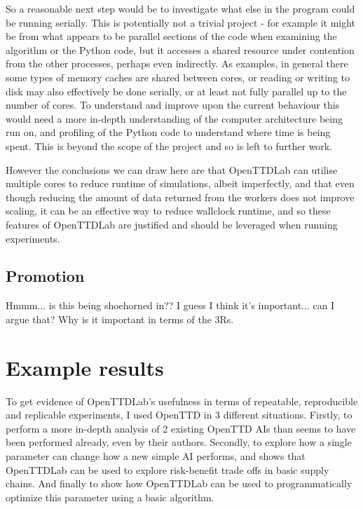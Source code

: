 \documentclass[logo,msc,dsti]{infthesis}    %
\begin{document}
So a reasonable next step would be to investigate what else in the program could be running serially. This is potentially not a trivial project - for example it might be from what appears to be parallel sections of the code when examining the algorithm or the Python code, but it accesses a shared resource under contention from the other processes, perhaps even indirectly. As examples, in general there some types of memory caches are shared between cores, or reading or writing to disk  may also effectively be done serially, or at least not fully parallel up to the number of cores. To understand and improve upon the current behaviour this would need a more in-depth understanding of the computer architecture being run on, and profiling of the Python code to understand where time is being spent. This is beyond the scope of the project and so is left to further work.

However the conclusions we can draw here are that OpenTTDLab can utilise multiple cores to reduce runtime of simulations, albeit imperfectly, and that even though reducing the amount of data returned from the workers does not improve scaling, it can be an effective way to reduce wallclock runtime, and so these features of OpenTTDLab are justified and should be leveraged when running experiments.

\section{Promotion}

Hmmm... is this being shoehorned in?? I guess I think it's important... can I argue that? Why is it important in terms of the 3Rs.


\chapter{Example results}

To get evidence of OpenTTDLab's usefulness in terms of repeatable, reproducible and replicable experiments, I used OpenTTD in 3 different situations. Firstly, to perform a more in-depth analysis of 2 existing OpenTTD AIs than seems to have been performed already, even by their authors. Secondly, to explore how a single parameter can change how a new simple AI performs, and shows that OpenTTDLab can be used to explore risk-benefit trade offs in basic supply chains. And finally to show how OpenTTDLab can be used to programmatically optimize this parameter using a basic algorithm.
\end{document}
